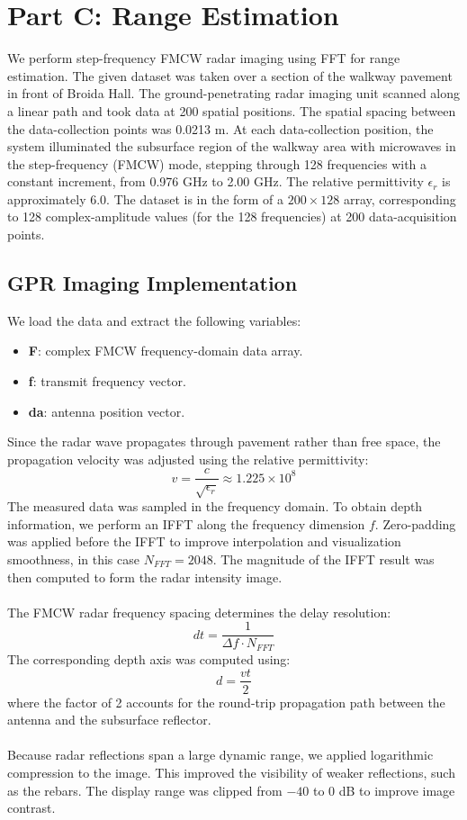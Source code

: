 \documentclass{article}
\begin{document}
\section*{Part C: Range Estimation}
We perform step-frequency FMCW radar imaging using FFT for range estimation. The given dataset was taken over a section of the walkway pavement in front of Broida Hall. The ground-penetrating radar imaging unit scanned along a linear path and took data at 200 spatial positions. The spatial spacing between the data-collection points was 0.0213 m. At each data-collection position, the system illuminated the subsurface region of the walkway area with microwaves in the step-frequency (FMCW) mode, stepping through 128 frequencies with a constant increment, from 0.976 GHz to 2.00 GHz. The relative permittivity \(\epsilon_r\) is approximately 6.0. The dataset is in the form of a \(200\times128\) array, corresponding to 128 complex-amplitude values (for the 128 frequencies) at 200 data-acquisition points.

\subsection*{GPR Imaging Implementation}
We load the data and extract the following variables:
\begin{itemize}
    \item \textbf{F}: complex FMCW frequency-domain data array.
    \item \textbf{f}: transmit frequency vector.
    \item \textbf{da}: antenna position vector.
\end{itemize}
Since the radar wave propagates through pavement rather than free space, the propagation velocity was adjusted using the relative permittivity:
\[
v=\frac{c}{\sqrt{\epsilon_r}}\approx1.225\times10^8
\]
The measured data was sampled in the frequency domain. To obtain depth information, we perform an IFFT along the frequency dimension \(f\). Zero-padding was applied before the IFFT to improve interpolation and visualization smoothness, in this case \(N_{FFT}=2048\). The magnitude of the IFFT result was then computed to form the radar intensity image.
\\
\\
The FMCW radar frequency spacing determines the delay resolution:
\[
dt = \frac{1}{\Delta f \cdot N_{FFT}}
\]
The corresponding depth axis was computed using:
\[
d=\frac{vt}{2}
\]
where the factor of 2 accounts for the round-trip propagation path between the antenna and the subsurface reflector.
\\
\\
Because radar reflections span a large dynamic range, we applied logarithmic compression to the image. This improved the visibility of weaker reflections, such as the rebars. The display range was clipped from \(-40\) to 0 dB to improve image contrast.
\end{document}
